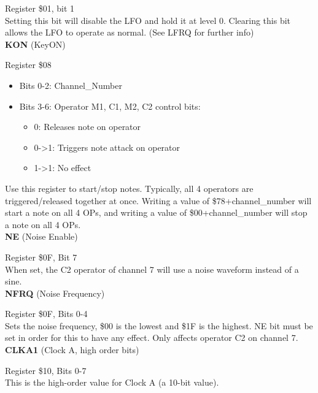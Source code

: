 Register \$01, bit 1\\

Setting this bit will disable the LFO and hold it at level 0. Clearing this bit
allows the LFO to operate as normal. (See LFRQ for further info)\\

{\bfseries KON} (KeyON)

Register \$08\\

\begin{itemize}
	\item Bits 0-2: Channel\_Number

	\item Bits 3-6: Operator M1, C1, M2, C2 control bits:
		\begin{itemize}
			\item 0: Releases note on operator
			\item 0->1: Triggers note attack on operator
			\item 1->1: No effect
		\end{itemize}
\end{itemize}

\vspace{16pt}

Use this register to start/stop notes. Typically, all 4 operators are
triggered/released together at once. Writing a value of \$78+channel\_number
will start a note on all 4 OPs, and writing a value of \$00+channel\_number
will stop a note on all 4 OPs.\\

{\bfseries NE} (Noise Enable)

Register \$0F, Bit 7\\

When set, the C2 operator of channel 7 will use a noise waveform instead of a
sine.\\

{\bfseries NFRQ} (Noise Frequency)

Register \$0F, Bits 0-4\\

Sets the noise frequency, \$00 is the lowest and \$1F is the highest. NE bit
must be set in order for this to have any effect. Only affects operator C2 on
channel 7.\\

{\bfseries CLKA1} (Clock A, high order bits)

Register \$10, Bits 0-7\\

This is the high-order value for Clock A (a 10-bit value).\\

